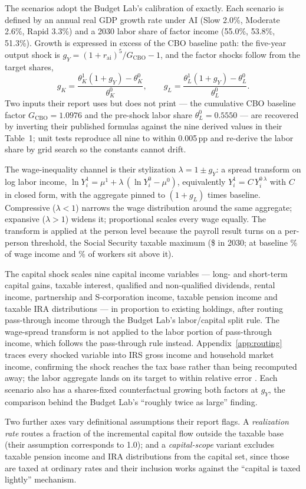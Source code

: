 The scenarios adopt the Budget Lab's calibration of \citet{karger2026}
exactly. Each scenario is defined by an annual real GDP growth rate under AI
(Slow 2.0\%, Moderate 2.6\%, Rapid 3.3\%) and a 2030 labor share of factor
income (55.0\%, 53.8\%, 51.3\%). Growth is expressed in excess of the CBO
baseline path: the five-year output shock is
$g_Y = (1+r_{\mathrm{ai}})^5 / G_{\mathrm{CBO}} - 1$, and the factor shocks
follow from the target shares,
\begin{equation}
g_K = \frac{\theta^1_K (1+g_Y) - \theta^0_K}{\theta^0_K}, \qquad
g_L = \frac{\theta^1_L (1+g_Y) - \theta^0_L}{\theta^0_L}.
\end{equation}
Two inputs their report uses but does not print --- the cumulative CBO
baseline factor $G_{\mathrm{CBO}} = 1.0976$ and the pre-shock labor share
$\theta^0_L = 0.5550$ --- are recovered by inverting their published
formulas against the nine derived values in their Table~1; unit tests
reproduce all nine to within 0.005\,pp and re-derive the labor share by grid
search so the constants cannot drift.

The wage-inequality channel is their stylization $\lambda = 1 \pm g_Y$: a
spread transform on log labor income,
$\ln Y^1_i = \mu^1 + \lambda\,(\ln Y^0_i - \mu^0)$, equivalently
$Y^1_i = C\,Y_i^{0\,\lambda}$ with $C$ in closed form, with the aggregate
pinned to $(1+g_L)$ times baseline. Compressive ($\lambda<1$) narrows the
wage distribution around the same aggregate; expansive ($\lambda>1$) widens
it; proportional scales every wage equally. The transform is applied at the
person level because the payroll result turns on a per-person threshold, the
Social Security taxable maximum (\$\genSSCap{} in 2030; at baseline
\genShareWagesAboveCapPct\% of wage income and
\genShareWorkersAboveCapPct\% of workers sit above it).

The capital shock scales nine capital income variables --- long- and
short-term capital gains, taxable interest, qualified and non-qualified
dividends, rental income, partnership and S-corporation income, taxable
pension income and taxable IRA distributions --- in proportion to existing
holdings, after routing pass-through income through the Budget Lab's
labor/capital split rule. The wage-spread transform is not applied to the
labor portion of pass-through income, which follows the pass-through rule
instead. Appendix~\ref{app:routing} traces every shocked
variable into IRS gross income and household market income, confirming the
shock reaches the tax base rather than being recomputed away; the labor
aggregate lands on its target to within relative error
\genLaborTargetMaxErr{}. Each scenario also has a shares-fixed
counterfactual growing both factors at $g_Y$, the comparison behind the
Budget Lab's ``roughly twice as large'' finding.

Two further axes vary definitional assumptions their report flags. A
\emph{realization rate} routes a fraction of the incremental capital flow
outside the taxable base (their assumption corresponds to 1.0); and a
\emph{capital-scope} variant excludes taxable pension income and IRA
distributions from the capital set, since those are taxed at ordinary rates
and their inclusion works against the ``capital is taxed lightly''
mechanism.

